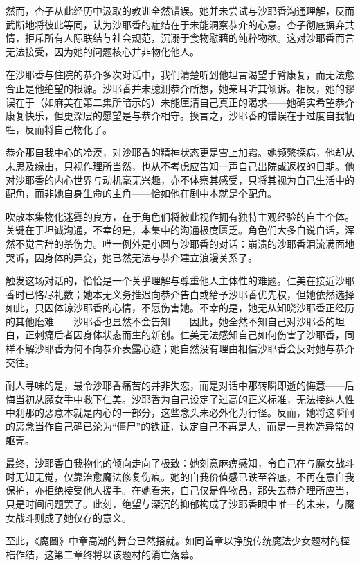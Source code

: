 然而，杏子从此经历中汲取的教训全然错误。她并未尝试与沙耶香沟通理解，反而武断地将彼此等同，认为沙耶香的症结在于未能洞察恭介的心意。杏子彻底摒弃共情，拒斥所有人际联结与社会规范，沉溺于食物慰藉的纯粹物欲。这对沙耶香而言无法接受，因为她的问题核心并非物化他人。

在沙耶香与住院的恭介多次对话中，我们清楚听到他坦言渴望手臂康复，而无法愈合正是他绝望的根源。沙耶香并未臆测恭介所想，她亲耳听其倾诉。相反，她的谬误在于（如麻美在第二集所暗示的）未能厘清自己真正的渴求——她确实希望恭介康复快乐，但更深层的愿望是与恭介相守。换言之，沙耶香的错误在于过度自我牺牲，反而将自己物化了。

恭介那自我中心的冷漠，对沙耶香的精神状态更是雪上加霜。她频繁探病，他却从未思及缘由，只视作理所当然，也从不考虑应告知一声自己出院或返校的日期。他对沙耶香的内心世界与动机毫无兴趣，亦不体察其感受，只将其视为自己生活中的配角，而非她自身生命的主角——恰如他在剧中本就是个配角。

吹散本集物化迷雾的良方，在于角色们将彼此视作拥有独特主观经验的自主个体。关键在于坦诚沟通，不幸的是，本集中的沟通极度匮乏。角色们大多自说自话，浑然不觉言辞的杀伤力。唯一例外是小圆与沙耶香的对话：崩溃的沙耶香泪流满面地哭诉，因身体的异变，她已然无法与恭介建立浪漫关系了。

触发这场对话的，恰恰是一个关乎理解与尊重他人主体性的难题。仁美在接近沙耶香时已恪尽礼数；她本无义务推迟向恭介告白或给予沙耶香优先权，但她依然选择如此，只因体谅沙耶香的心情，不愿伤害她。不幸的是，她无从知晓沙耶香正经历的其他磨难——沙耶香也显然不会告知——因此，她全然不知自己对沙耶香的坦白，正刺痛后者因身体状态而生的新创。仁美无法感知自己如何伤害了沙耶香，同样不解沙耶香为何不向恭介表露心迹；她自然没有理由相信沙耶香会反对她与恭介交往。

耐人寻味的是，最令沙耶香痛苦的并非失恋，而是对话中那转瞬即逝的悔意——后悔当初从魔女手中救下仁美。沙耶香为自己设定了过高的正义标准，无法接纳人性中刹那的恶意本就是内心的一部分，这些念头未必外化为行径。反而，她将这瞬间的恶念当作自己确已沦为“僵尸”的铁证，认定自己不再是人，而是一具构造异常的躯壳。

最终，沙耶香自我物化的倾向走向了极致：她刻意麻痹感知，令自己在与魔女战斗时无知无觉，仅靠治愈魔法修复伤痕。她的自我价值感已跌至谷底，不再在意自我保护，亦拒绝接受他人援手。在她看来，自己仅是件物品，那失去恭介理所应当，只是时间问题罢了。此刻，绝望与深沉的抑郁构成了沙耶香眼中唯一的未来，与魔女战斗则成了她仅存的意义。

至此，《魔圆》中章高潮的舞台已然搭就。如同首章以挣脱传统魔法少女题材的桎梏作结，这第二章终将以该题材的消亡落幕。
